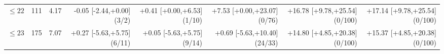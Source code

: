 \begin{table}[h]
\begin{tabular}{rrrrrrrr}
$\le22$ & 111 & 4.17 & -0.05 {\scriptsize[-2.44,+0.00]} {\scriptsize(3/2)} & +0.41 {\scriptsize[+0.00,+6.53]} {\scriptsize(1/10)} & +7.53 {\scriptsize[+0.00,+23.07]} {\scriptsize(0/76)} & +16.78 {\scriptsize[+9.78,+25.54]} {\scriptsize(0/100)} & +17.14 {\scriptsize[+9.78,+25.54]} {\scriptsize(0/100)} \\
$\le23$ & 175 & 7.07 & +0.27 {\scriptsize[-5.63,+5.75]} {\scriptsize(6/11)} & +0.05 {\scriptsize[-5.63,+5.75]} {\scriptsize(9/14)} & +0.69 {\scriptsize[-5.63,+10.40]} {\scriptsize(24/33)} & +14.80 {\scriptsize[+4.85,+20.38]} {\scriptsize(0/100)} & +15.37 {\scriptsize[+4.85,+20.38]} {\scriptsize(0/100)} \\
\bottomrule
\end{tabular}
\end{table}
